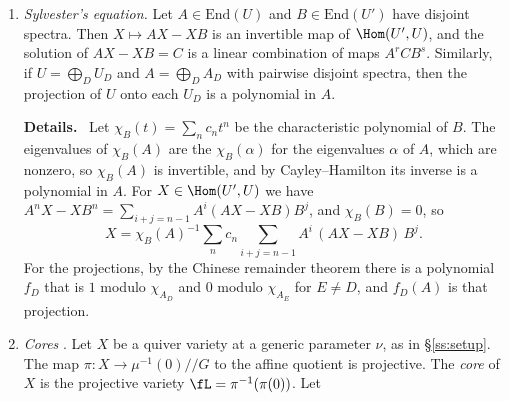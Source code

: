 \documentclass[11pt]{amsart}
\newenvironment{details}{\par\color{black!60!green}\noindent\textbf{Details.}\ }{\par}
\begin{document}
\begin{enumerate}[leftmargin=2.6em,label=(I\arabic*)]
\begin{enumerate}[label=(\alph*)]
\item Let a finite group $H$ act linearly on a complex vector space $U$.  The
average $\Av_H=|H|^{-1}\sum_{h\in H}h$ is an $H$-equivariant projection of $U$
onto $U^H$.  So for an $H$-stable subspace $U'\subseteq U$ we have
$\Av_H(U')=U'^H$ and $(U/U')^H=U^H/U'^H$.
\item The symmetric polynomials in $n$ variables are generated by the power
sums of degrees $1,\dots,n$ (Newton's identities).
\item Let $C=\bigoplus_{i\ge0}C_i$ be a finite-dimensional graded commutative
algebra with $C_0=\C$, and $C_+=\bigoplus_{i>0}C_i$.  The \emph{socle} of $C$
is the annihilator of $C_+$, and $C$ is \emph{level} if its socle is its top
nonzero degree.  Every nonzero graded ideal $K$ of $C$ meets the socle.
\begin{details}
If $x\in K$ is homogeneous and nonzero of the largest degree
occurring in $K$, then $C_+x\subseteq K$ lies in higher degrees, so
$C_+x=0$.
\end{details}
\end{enumerate}
\item\label{I:sylv} \emph{Sylvester's equation.}  Let $A\in\mathrm{End}(U)$
and $B\in\mathrm{End}(U')$ have disjoint spectra.  Then $X\mapsto AX-XB$ is an
invertible map of $\Hom(U',U)$, and the solution of $AX-XB=C$ is a linear
combination of maps $A^rCB^s$.  Similarly, if $U=\bigoplus_DU_D$ and
$A=\bigoplus_DA_D$ with pairwise disjoint spectra, then the projection of
$U$ onto each $U_D$ is a polynomial in $A$.
\begin{details}
Let $\chi_B(t)=\sum_nc_nt^n$ be the characteristic polynomial of $B$.  The
eigenvalues of $\chi_B(A)$ are the $\chi_B(\alpha)$ for the eigenvalues
$\alpha$ of $A$, which are nonzero, so $\chi_B(A)$ is invertible, and by
Cayley--Hamilton its inverse is a polynomial in $A$.  For
$X\in\Hom(U',U)$ we have
$A^nX-XB^n=\sum_{i+j=n-1}A^i(AX-XB)B^j$, and $\chi_B(B)=0$, so
\[
 X=\chi_B(A)^{-1}\sum_nc_n\sum_{i+j=n-1}A^i\,(AX-XB)\,B^j .
\]
For the projections, by the Chinese remainder
theorem there is a polynomial $f_D$ that is $1$ modulo $\chi_{A_D}$ and $0$
modulo $\chi_{A_E}$ for $E\neq D$, and $f_D(A)$ is that projection.
\end{details}
\item\label{I:core} \emph{Cores} \cite{hauselCohomologyLarge2013}.  Let $X$ be a quiver variety
at a generic parameter $\nu$, as in \S\ref{ss:setup}.  The map
$\pi\colon X\to\mu^{-1}(0)/\!/G$ to the affine quotient is projective.  The
\emph{core} of $X$ is the projective variety $\fL=\pi^{-1}(\pi(0))$.  Let

\end{enumerate}
\end{document}
